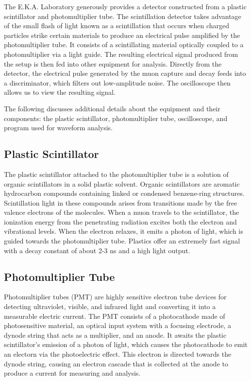 \documentclass[
 reprint,
 twocolumn,
 amsmath,amssymb,
 aps,
 pra,
 floatfix,
]{revtex4-1}
\begin{document}
The E.K.A. Laboratory generously provides a detector constructed from a
plastic scintillator and photomultiplier tube. The scintillation detector takes
advantage of the small flash of light known as a scintillation that occurs when
charged particles strike certain materials to produce an electrical pulse
amplified by the photomultiplier tube. It consists of a scintillating material
optically coupled to a photomultiplier via a light guide. The resulting
electrical signal produced from the setup is then fed into other equipment for
analysis. Directly from the detector, the electrical pulse generated by the muon capture
and decay feeds into a discriminator, which filters out low-amplitude noise.
The oscilloscope then allows us to view the resulting signal.

The following discusses additional details about the equipment and their
components: the plastic scintillator, photomultiplier tube, oscilloscope, and
program used for waveform analysis.

\subsection{Plastic Scintillator}

The plastic scintillator attached to the photomultiplier tube is a solution of
organic scintillators in a solid plastic solvent. Organic scintillators are
aromatic hydrocarbon compounds containing linked or condensed benzene-ring
structures. Scintillation light in these compounds arises from transitions made
by the free valence electrons of the molecules. When a muon travels to the
scintillator, the ionization energy from the penetrating radiation excites both
the electron and vibrational levels. When the electron relaxes, it emits a
photon of light, which is guided towards the photomultiplier tube. Plastics
offer an extremely fast signal with a decay constant of about 2-3 ns and a high
light output.\cite{leotechniquesforexperiments}

\subsection{Photomultiplier Tube}

Photomultiplier tubes (PMT) are highly sensitive electron tube devices for
detecting ultraviolet, visible, and infrared light and converting it into a
measurable electric current. The PMT consists of a photocathode made of
photosensitive material, an optical input system with a focusing electrode, a
dynode string that acts as a multiplier, and an anode. It awaits the plastic
scintillator's emission of a photon of light, which causes the photocathode
to emit an electorn via the photoelectric effect. This electron is directed
towards the dynode string, causing an electron cascade that is collected at
the anode to produce a current for measuring and analysis.\cite{leotechniquesforexperiments}
\end{document}

